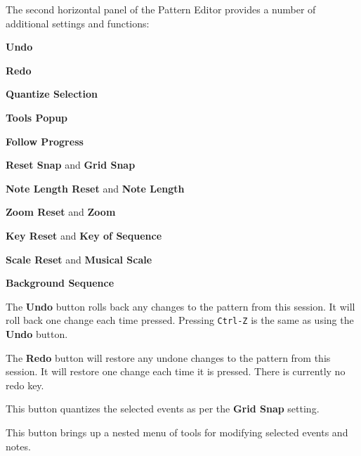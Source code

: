    The second horizontal panel of the Pattern Editor provides a number
   of additional settings and functions:

   \begin{enumber}
      \item \textbf{Undo}
      \item \textbf{Redo}
      \item \textbf{Quantize Selection}
      \item \textbf{Tools Popup}
      \item \textbf{Follow Progress}
      \item \textbf{Reset Snap} and \textbf{Grid Snap}
      \item \textbf{Note Length Reset} and \textbf{Note Length}
      \item \textbf{Zoom Reset} and \textbf{Zoom}
      \item \textbf{Key Reset} and \textbf{Key of Sequence}
      \item \textbf{Scale Reset} and \textbf{Musical Scale}
      \item \textbf{Background Sequence}
   \end{enumber}

   \setcounter{ItemCounter}{0}      %

   The \textbf{Undo} button rolls back any changes to the pattern from this
   session.  It will roll back one change each time pressed.
   Pressing \texttt{Ctrl-Z} is the same as using the \textbf{Undo} button.

   The \textbf{Redo} button will restore any undone changes to the pattern from
   this session.
   It will restore one change each time it is pressed.
   There is currently no redo key.

   This button quantizes the selected events as per
   the \textbf{Grid Snap} setting.

   This button brings up a nested menu of tools for modifying selected
   events and notes.

